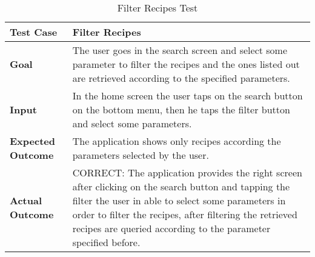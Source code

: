 \begin{table}[H]
	\centering
	\begin{tabular}{|l|l|}
	\hline
	\textbf{Test Case}& Filter Recipes\\
	\hline
	\textbf{Goal}& 
	\begin{minipage}{.7\linewidth}
	The user goes in the search screen and select some parameter to filter the recipes and the ones listed out are retrieved according to the specified parameters.
	\end{minipage}\\
	\hline
	\textbf{Input}& 
	\begin{minipage}{.7\linewidth}
	In the home screen the user taps on the search button on the bottom menu, then he taps the filter button and select some parameters.
	\end{minipage}\\
	\hline
	\textbf{Expected Outcome}& 
	\begin{minipage}{.7\linewidth}
	The application shows only recipes according the parameters selected by the user.
	\end{minipage}\\
	\hline
	\textbf{Actual Outcome}& 
	\begin{minipage}{.7\linewidth}
	CORRECT: The application provides the right screen after clicking on the search button and tapping the filter the user in able to select some parameters in order to filter the recipes, after filtering the retrieved recipes are queried according to the parameter specified before.
	\end{minipage}\\
	\hline	
	\end{tabular}
	\caption{Filter Recipes Test}
\end{table}

